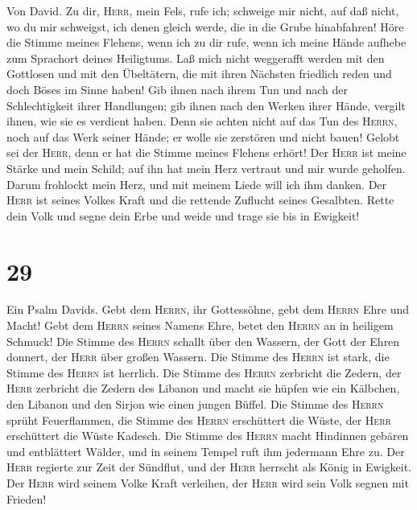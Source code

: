  Von David. Zu dir, \textsc{Herr}, mein Fels, rufe ich;
schweige mir nicht, auf daß nicht, wo du mir schweigst, ich denen gleich
werde, die in die Grube hinabfahren!  Höre die Stimme
meines Flehens, wenn ich zu dir rufe, wenn ich meine Hände aufhebe zum
Sprachort deines Heiligtums.  Laß mich nicht weggerafft
werden mit den Gottlosen und mit den Übeltätern, die mit ihren Nächsten
friedlich reden und doch Böses im Sinne haben!  Gib ihnen
nach ihrem Tun und nach der Schlechtigkeit ihrer Handlungen; gib ihnen
nach den Werken ihrer Hände, vergilt ihnen, wie sie es verdient haben.
 Denn sie achten nicht auf das Tun des \textsc{Herrn},
noch auf das Werk seiner Hände; er wolle sie zerstören und nicht bauen!
 Gelobt sei der \textsc{Herr}, denn er hat die Stimme
meines Flehens erhört!  Der \textsc{Herr} ist meine Stärke
und mein Schild; auf ihn hat mein Herz vertraut und mir wurde geholfen.
Darum frohlockt mein Herz, und mit meinem Liede will ich ihm danken.
 Der \textsc{Herr} ist seines Volkes Kraft und die
rettende Zuflucht seines Gesalbten.  Rette dein Volk und
segne dein Erbe und weide und trage sie bis in Ewigkeit!

\hypertarget{section-28}{%
\section{29}\label{section-28}}

 Ein Psalm Davids. Gebt dem \textsc{Herrn}, ihr
Gottessöhne, gebt dem \textsc{Herrn} Ehre und Macht!  Gebt
dem \textsc{Herrn} seines Namens Ehre, betet den \textsc{Herrn} an in
heiligem Schmuck!  Die Stimme des \textsc{Herrn} schallt
über den Wassern, der Gott der Ehren donnert, der \textsc{Herr} über
großen Wassern.  Die Stimme des \textsc{Herrn} ist stark,
die Stimme des \textsc{Herrn} ist herrlich.  Die Stimme
des \textsc{Herrn} zerbricht die Zedern, der \textsc{Herr} zerbricht die
Zedern des Libanon  und macht sie hüpfen wie ein Kälbchen,
den Libanon und den Sirjon wie einen jungen Büffel.  Die
Stimme des \textsc{Herrn} sprüht Feuerflammen,  die Stimme
des \textsc{Herrn} erschüttert die Wüste, der \textsc{Herr} erschüttert
die Wüste Kadesch.  Die Stimme des \textsc{Herrn} macht
Hindinnen gebären und entblättert Wälder, und in seinem Tempel ruft ihm
jedermann Ehre zu.  Der \textsc{Herr} regierte zur Zeit
der Sündflut, und der \textsc{Herr} herrscht als König in Ewigkeit.
 Der \textsc{Herr} wird seinem Volke Kraft verleihen, der
\textsc{Herr} wird sein Volk segnen mit Frieden!

